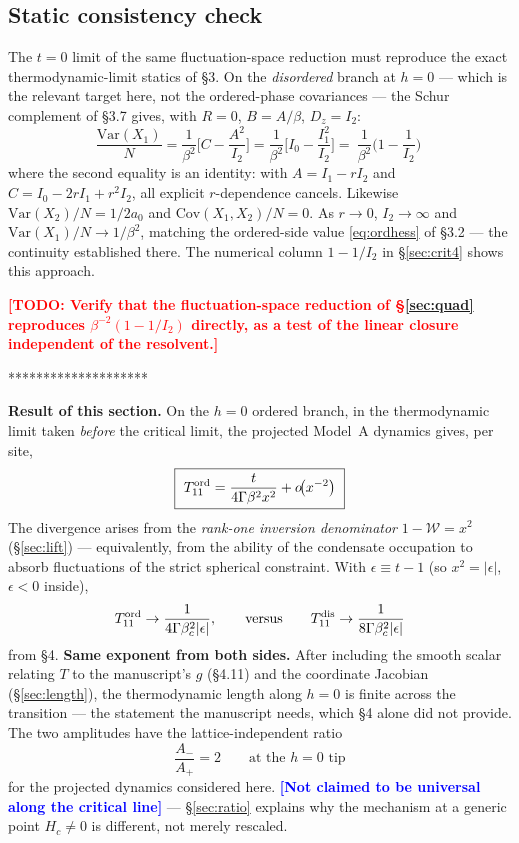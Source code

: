 \documentclass[11pt,a4paper]{article}
\newcommand{\Wc}{\mathcal{W}}
\newcommand{\TODO}[1]{\textcolor{red}{\textbf{[TODO: #1]}}}
\newcommand{\FLAG}[1]{\textcolor{blue}{\textbf{[#1]}}}
\newcommand{\Tm}{T}
\newcommand{\Wc}{\mathcal{W}}
\newcommand{\TODO}[1]{\textcolor{red}{\textbf{[TODO: #1]}}}
\newcommand{\FLAG}[1]{\textcolor{blue}{\textbf{[#1]}}}
\begin{document}
\subsection{Static consistency check}
\label{sec:staticcheck}
The $t=0$ limit of the same fluctuation-space reduction must reproduce the exact
thermodynamic-limit statics of \S3. On the \emph{disordered} branch at $h=0$ --- which is
the relevant target here, not the ordered-phase covariances --- the Schur complement of
\S3.7 gives, with $R=0$, $B=A/\beta$, $D_z=I_2$:
\begin{equation}
  \frac{\mathrm{Var}(X_1)}{N}=\frac{1}{\beta^2}\Big[C-\frac{A^2}{I_2}\Big]
   =\frac{1}{\beta^2}\Big[I_0-\frac{I_1^2}{I_2}\Big]
   =\boxed{\ \frac{1}{\beta^{2}}\Big(1-\frac{1}{I_2}\Big)\ }
\end{equation}
where the second equality is an identity: with $A=I_1-rI_2$ and $C=I_0-2rI_1+r^2I_2$, all
explicit $r$-dependence cancels. Likewise $\mathrm{Var}(X_2)/N=1/2a_0$ and
$\mathrm{Cov}(X_1,X_2)/N=0$. As $r\to0$, $I_2\to\infty$ and
$\mathrm{Var}(X_1)/N\to1/\beta^2$, matching the ordered-side value \eqref{eq:ordhess} of
\S3.2 --- the continuity established there. The numerical column $1-1/I_2$ in
\S\ref{sec:crit4} shows this approach.

\TODO{Verify that the fluctuation-space reduction of \S\ref{sec:quad} reproduces
$\beta^{-2}(1-1/I_2)$ directly, as a test of the linear closure independent of the
resolvent.}




********************

\textbf{Result of this section.} On the $h=0$ ordered branch, in the thermodynamic limit
taken \emph{before} the critical limit, the projected Model~A dynamics gives, per site,
\begin{equation}
  \boxed{\ \Tm_{11}^{\rm ord}=\frac{t}{4\Gamma\beta^{2}x^{2}}+o\!\big(x^{-2}\big)\ }
  \label{eq:T11ord}
\end{equation}
The divergence arises from the \emph{rank-one inversion denominator} $1-\Wc=x^2$
(\S\ref{sec:lift}) --- equivalently, from the ability of the condensate occupation to absorb
fluctuations of the strict spherical constraint. With $\epsilon\equiv t-1$ (so
$x^2=|\epsilon|$, $\epsilon<0$ inside),
\begin{equation}
  \Tm_{11}^{\rm ord}\to\frac{1}{4\Gamma\beta_c^{2}|\epsilon|},
  \qquad\text{versus}\qquad
  \Tm_{11}^{\rm dis}\to\frac{1}{8\Gamma\beta_c^{2}|\epsilon|}
\end{equation}
from \S4. \textbf{Same exponent from both sides.} After including the smooth scalar relating
$\Tm$ to the manuscript's $g$ (\S4.11) and the coordinate Jacobian
(\S\ref{sec:length}), the thermodynamic length along $h=0$ is finite across the transition
--- the statement the manuscript needs, which \S4 alone did not provide. The two amplitudes
have the lattice-independent ratio
\begin{equation}
  \boxed{\ \frac{A_-}{A_+}=2\qquad\text{at the }h=0\text{ tip}\ }
\end{equation}
for the projected dynamics considered here. \FLAG{Not claimed to be universal along the
critical line} --- \S\ref{sec:ratio} explains why the mechanism at a generic point
$H_c\neq0$ is different, not merely rescaled.
\end{document}
